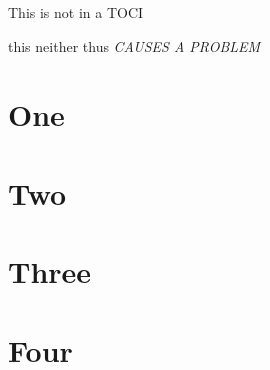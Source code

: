\documentclass{article}
\begin{document}
  {This is not in a TOCI}
  {}
  {}
  {this neither thus \emph{CAUSES A PROBLEM}\par}

\tableofcontents

\section{One}

\section{Two}

\section{Three}

\section{Four}
\end{document}
